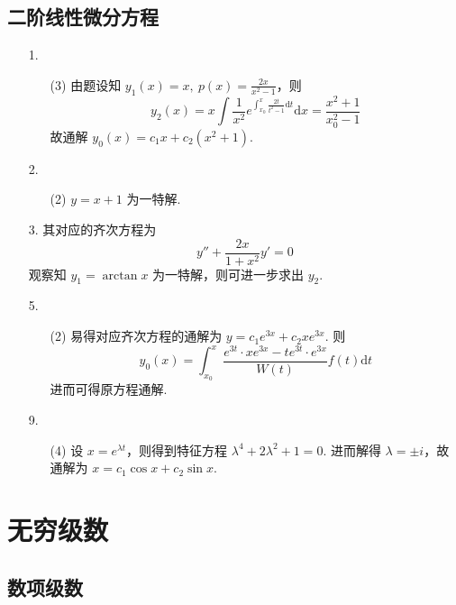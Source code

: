 \documentclass[11pt,oneside,fontset=fandol]{ctexbook} %
\begin{document}
\section{二阶线性微分方程}

\begin{enumerate}
    \item[1.]
    \begin{enumerate}
        \item[(3)]
        由题设知 $y_1(x) = x,\ p(x) = \frac{2x}{x^2 - 1}$，则
        \[
            y_2(x) = x \int \frac 1 {x^2} e^{\int_{x_0}^x \frac{2t}{t^2 - 1} \mathrm dt} \mathrm dx = \frac{x^2 + 1}{x_0^2 - 1}
        \]
        故通解 $y_0(x) = c_1x + c_2 (x^2 + 1)$.
    \end{enumerate}
    \item[2.]
    \begin{enumerate}
        \item[(2)]
        $y = x + 1$ 为一特解.
    \end{enumerate}
    \item[3.]
    其对应的齐次方程为
    \[
        y'' + \frac{2x}{1 + x^2} y' = 0
    \]
    观察知 $y_1 = \arctan x$ 为一特解，则可进一步求出 $y_2$.
    \item[5.]
    \begin{enumerate}
        \item[(2)]
        易得对应齐次方程的通解为 $y = c_1 e^{3x} + c_2 x e^{3x}$. 则
        \[
            y_0(x) = \int_{x_0}^x \frac{e^{3t} \cdot xe^{3x} - te^{3t} \cdot e^{3x}}{W(t)} f(t) \mathrm dt
        \]
        进而可得原方程通解.
    \end{enumerate}
    \item[9.]
    \begin{enumerate}
        \item[(4)]
        设 $x = e^{\lambda t}$，则得到特征方程 $\lambda^4 + 2\lambda^2 + 1 = 0$. 进而解得 $\lambda = \pm i$，故通解为 $x = c_1 \cos x + c_2 \sin x$.
    \end{enumerate}
    
\end{enumerate}

\newpage

\chapter{无穷级数}

\section{数项级数}
\end{document}
